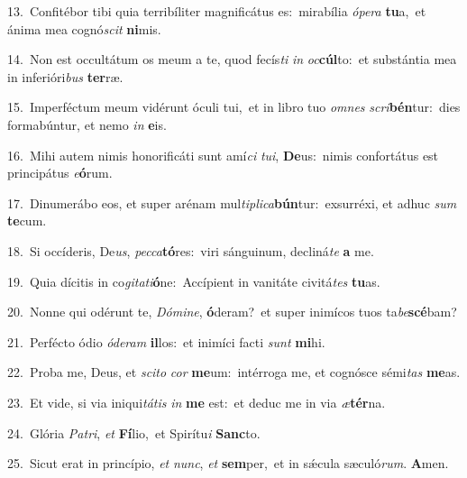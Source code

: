 {\numbfont\textcolor{\numbcolor}{13.}}~Confitébor tibi quia terribíliter magnificátus es:~\dagger mirabília \textit{ó}\-\textit{pe}\textit{ra} \textbf{tu}\-a,~\star et ánima mea cognó\textit{scit} \textbf{ni}\-mis.\par
{\numbfont\textcolor{\numbcolor}{14.}}~Non est occultátum os meum a te, quod fecís\textit{ti} \textit{in} \textit{oc}\-\textbf{cúl}to:~\star et substántia mea in inferióri\textit{bus} \textbf{ter}\-ræ.\par
{\numbfont\textcolor{\numbcolor}{15.}}~Imperféctum meum vidérunt óculi tui,~\dagger et in libro tuo \textit{om}\-\textit{nes} \textit{scri}\-\textbf{bén}tur:~\star dies formabúntur, et nemo \textit{in} \textbf{e}\-is.\par
{\numbfont\textcolor{\numbcolor}{16.}}~Mihi autem nimis honorificáti sunt amí\textit{ci} \textit{tu}\-\textit{i}, \textbf{De}\-us:~\star nimis confortátus est principátus \textit{e}\-\textbf{ó}rum.\par
{\numbfont\textcolor{\numbcolor}{17.}}~Dinumerábo eos, et super arénam mul\-\textit{ti}\-\textit{pli}\textit{ca}\textbf{bún}tur:~\star exsurréxi, et adhuc \textit{sum} \textbf{te}\-cum.\par
{\numbfont\textcolor{\numbcolor}{18.}}~Si occíderis, De\-\textit{us}\-, \textit{pec}\-\textit{ca}\textbf{tó}res:~\star viri sánguinum, decliná\textit{te} \textbf{a} me.\par
{\numbfont\textcolor{\numbcolor}{19.}}~Quia dícitis in co\-\textit{gi}\-\textit{ta}\textit{ti}\textbf{ó}ne:~\star Accípient in vanitáte civitá\textit{tes} \textbf{tu}\-as.\par
{\numbfont\textcolor{\numbcolor}{20.}}~Nonne qui odérunt te, \textit{Dó}\-\textit{mi}\textit{ne}, \textbf{ó}\-deram?~\star et super inimícos tuos ta\-\textit{be}\-\textbf{scé}bam?\par
{\numbfont\textcolor{\numbcolor}{21.}}~Perfécto ódio \textit{ó}\-\textit{de}\textit{ram} \textbf{il}\-los:~\star et inimíci facti \textit{sunt} \textbf{mi}\-hi.\par
{\numbfont\textcolor{\numbcolor}{22.}}~Proba me, Deus, et \textit{sci}\-\textit{to} \textit{cor} \textbf{me}\-um:~\star intérroga me, et cognósce sémi\textit{tas} \textbf{me}\-as.\par
{\numbfont\textcolor{\numbcolor}{23.}}~Et vide, si via iniqui\-\textit{tá}\-\textit{tis} \textit{in} \textbf{me} est:~\star et deduc me in via \textit{æ}\-\textbf{tér}na.\par
{\numbfont\textcolor{\numbcolor}{24.}}~Glória \textit{Pa}\-\textit{tri}, \textit{et} \textbf{Fí}\-lio,~\star et Spirítu\textit{i} \textbf{Sanc}\-to.\par
{\numbfont\textcolor{\numbcolor}{25.}}~Sicut erat in princípio, \textit{et} \textit{nunc}\-, \textit{et} \textbf{sem}\-per,~\star et in sǽcula sæculó\-\textit{rum}\-. \textbf{A}\-men.\par
